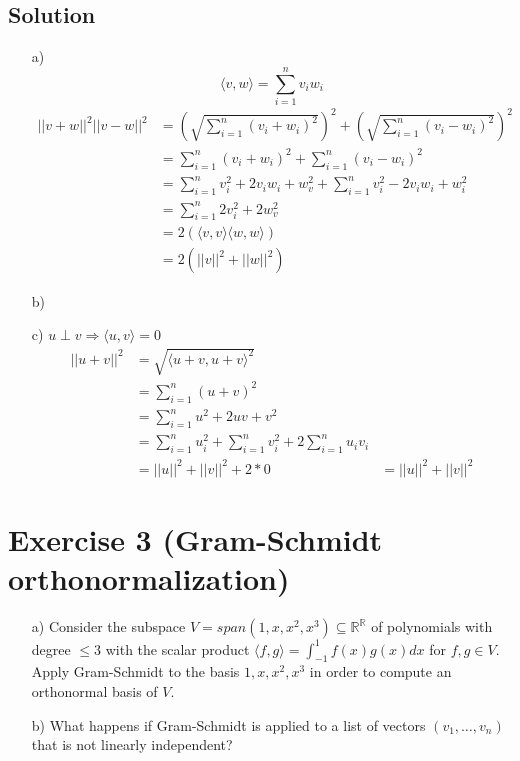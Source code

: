 \documentclass[10pt]{article}
\numberwithin{equation}{section}
\begin{document}
\subsection*{Solution}
\begin{enumerate}
\item[a)]{
$$\langle v, w \rangle = \sum_{i=1}^n v_i w_i$$
    \begin{align*}
      ||v + w||^2 ||v - w||^2 &= \left(\sqrt{\sum_{i=1}^n (v_i + w_i)^2}\right)^2 + \left(\sqrt{\sum_{i=1}^n (v_i - w_i)^2}\right)^2\\
      &= \sum_{i=1}^n (v_i + w_i)^2+ \sum_{i=1}^n (v_i - w_i)^2\\
      &= \sum_{i=1}^n v_i^2 +2v_i w_i + w_v^2 + \sum_{i=1}^n v_i^2 -2v_i w_i  + w_i^2\\
      &= \sum_{i=1}^n 2v_i^2 + 2w_v^2 \\
      &= 2 (\langle v,v \rangle \langle w,w \rangle)\\
      &= 2 (||v||^2 + ||w||^2)
    \end{align*}
  }
\item[b)]{
  }
\item[c)]{
    $u \perp v \Rightarrow \langle u,v \rangle = 0$
    \begin{align*}
      || u + v ||^2 &= \sqrt{\langle u+v, u+v\rangle^2 }\\
                    &= \sum_{i=1}^n (u+v)^2\\
                    &= \sum_{i=1}^n u^2 + 2uv + v^2\\
                    &= \sum_{i=1}^n u_i^2 + \sum_{i=1}^n v_i^2 + 2\sum_{i=1}^n u_i v_i\\
                    &= ||u||^2 + ||v||^2 + 2*0
                    &= ||u||^2 + ||v||^2 
    \end{align*}
  }
\end{enumerate}
\section*{Exercise 3 (Gram-Schmidt orthonormalization)}
\begin{enumerate}
\item[a)]{
    Consider the subspace $V = span(1, x, x^2 , x^3) \subseteq \mathbb{R}^{\mathbb{R}}$ of polynomials with degree $\leq 3$ with the scalar product $\langle f, g\rangle = \int_{-1}^1 f(x)g(x)dx$ for $f, g \in V$. Apply Gram-Schmidt to the basis $1, x, x^2 , x^3$ in order to compute an orthonormal basis of $V$.
  }
\item[b)]{
    What happens if Gram-Schmidt is applied to a list of vectors $(v_1, \dots, v_n)$ that is not linearly independent?
  }
\end{enumerate}
\end{document}
